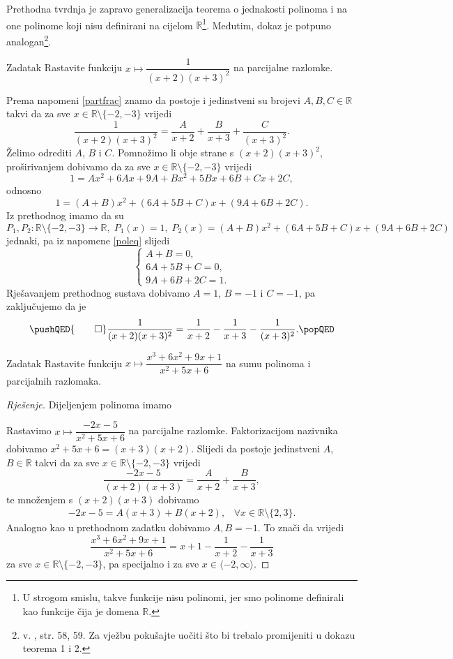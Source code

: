 Prethodna tvrdnja je zapravo generalizacija teorema o jednakosti polinoma i na one polinome koji nisu definirani na cijelom \(\mathbb{R}\)\footnote{U strogom smislu, takve funkcije nisu polinomi, jer smo polinome definirali kao funkcije čija je domena $\mathbb{R}$.}. Međutim, dokaz je potpuno analogan\footnote{v. \cite{12}, str. 58, 59. Za vježbu pokušajte uočiti što bi trebalo promijeniti u dokazu teorema 1 i 2.}.
\begin{exercise}{Zadatak}
Rastavite funkciju \(x\mapsto \dfrac{1}{(x+2)(x+3)^2}\) na parcijalne razlomke.
\end{exercise}
\begin{proof*}
Prema napomeni \ref{partfrac} znamo da postoje i jedinstveni su brojevi \(A, B, C\in \mathbb{R}\) takvi da za sve \(x\in \mathbb{R}\setminus\{-2, -3\}\) vrijedi
\[\dfrac{1}{(x+2)(x+3)^2}=\dfrac{A}{x+2}+\dfrac{B}{x+3}+\dfrac{C}{(x+3)^2}.\]
Želimo odrediti \(A\), \(B\) i \(C\). Pomnožimo li obje strane s \((x+2)(x+3)^2\), proširivanjem dobivamo da za sve \(x\in \mathbb{R}\setminus\{-2, -3\}\) vrijedi
\[1=Ax^2+6Ax+9A+Bx^2+5Bx+6B+Cx+2C,\]
odnosno
\[1=(A+B)x^2+(6A+5B+C)x+(9A+6B+2C).\]
Iz prethodnog imamo da su \[P_1, P_2 : \mathbb{R}\setminus\{-2, -3\}\to \mathbb{R},\;P_1(x)=1,\; P_2(x)= (A+B)x^2+(6A+5B+C)x+(9A+6B+2C)\] jednaki, pa iz napomene \ref{poleq} slijedi
\[\begin{cases}
A+B=0, \\
6A+5B+C=0, \\
9A+6B+2C=1.
   \end{cases}\]
Rješavanjem prethodnog sustava dobivamo \(A=1\), \(B=-1\) i \(C=-1\), pa zaključujemo da je
\[
\pushQED{\qed}
\dfrac{1}{(x+2)(x+3)^2}=\dfrac{1}{x+2}-\dfrac{1}{x+3}-\dfrac{1}{(x+3)^2}.\qedhere
\popQED
\]
\end{proof*}
\begin{exercise}{Zadatak}
Rastavite funkciju \(x\mapsto \dfrac{x^3+6x^2+9x+1}{x^2+5x+6}\) na sumu polinoma i parcijalnih razlomaka.
\end{exercise}
\begin{proof}[Rješenje]
Dijeljenjem polinoma imamo
\begin{center}
\end{center}
Rastavimo \(x\mapsto \dfrac{-2x-5}{x^2+5x+6}\) na parcijalne razlomke. Faktorizacijom nazivnika dobivamo \(x^2+5x+6=(x+3)(x+2)\). Slijedi da postoje jedinstveni \(A\), \(B\in \mathbb{R}\) takvi da za sve \(x\in \mathbb{R}\setminus\{-2, -3\}\) vrijedi
\[\dfrac{-2x-5}{(x+2)(x+3)}=\dfrac{A}{x+2}+\dfrac{B}{x+3},\]
te množenjem s \((x+2)(x+3)\) dobivamo 
\begin{gather}
\label{partfrac2}
-2x-5=A(x+3)+B(x+2),\;\;\; \forall x\in \mathbb{R}\setminus\{2, 3\}.
\end{gather}
Analogno kao u prethodnom zadatku dobivamo \(A, B=-1\). To znači da vrijedi
\[\dfrac{x^3+6x^2+9x+1}{x^2+5x+6}=x+1-\dfrac{1}{x+2}-\dfrac{1}{x+3}\]
za sve \(x\in \mathbb{R}\setminus\{-2, -3\}\), pa specijalno i za sve \(x\in\langle -2,\infty \rangle\).
\end{proof}
